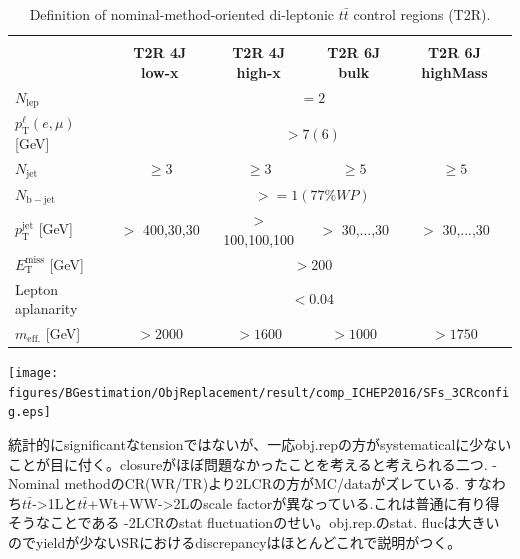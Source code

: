 \begin{table}[bh]
  \small
  \begin{center}
    \begin{tabular}{lcccc}
      \toprule
      \toprule
      & \hspace*{30mm} \\[-3mm]
      & {\bf T2R 4J low-x}    & {\bf T2R 4J high-x} & {\bf T2R 6J bulk} & {\bf T2R 6J highMass}  \\[1mm]
      \midrule
      \midrule
      $N_{\mathrm{lep}}$                       &  \multicolumn{4}{c}{$= 2$}   \\
      $p_{\mathrm{T}}^{\ell} (e,\mu)$  [GeV]   &  \multicolumn{4}{c}{$>7(6)$} \\   
      \midrule
      $N_{\mathrm{jet}}$                       & $\geq 3 $     & $\geq 3$        & $\geq 5$      & $\geq 5$ \\      
      $N_{\mathrm{b-jet}}$                     & \multicolumn{4}{c}{$>=1 (77\% WP)$}   \\      
      $p_{\mathrm{T}}^{\mathrm{jet}}$ [GeV]    & $>$ 400,30,30 & $>$ 100,100,100 & $>$ 30,...,30 & $>$ 30,...,30   \\ 
      \midrule
      $E_{\mathrm{T} }^{\mathrm{miss}}$ [GeV]  & \multicolumn{4}{c}{$>200$}   \\
      Lepton aplanarity                        & \multicolumn{4}{c}{$<0.04$}   \\ 
      $m_{\mathrm{eff.}}$ [GeV]                & $> 2000$      & $> 1600$        & $> 1000$      & $> 1750$  \\
      \bottomrule
      \bottomrule
    \end{tabular}
     \caption{ Definition of nominal-method-oriented di-leptonic $t\bar{t}$ control regions (T2R). }
    \label{tab::ObjReplace::result::T2R}
  \end{center}
\end{table}


\texttt{[image: figures/BGestimation/ObjReplacement/result/comp\_ICHEP2016/SFs\_3CRconfig.eps]}
\label{fig::ObjReplace::result::SFs_3CRconfig}


統計的にsignificantなtensionではないが、一応obj.repの方がsystematicalに少ないことが目に付く。closureがほぼ問題なかったことを考えると考えられる二つ.
-Nominal methodのCR(WR/TR)より2LCRの方がMC/dataがズレている. すなわち$t\bar{t}$->1Lと$t\bar{t}$+Wt+WW->2Lのscale factorが異なっている.これは普通に有り得そうなことである
-2LCRのstat fluctuationのせい。obj.rep.のstat. flucは大きいのでyieldが少ないSRにおけるdiscrepancyはほとんどこれで説明がつく。


